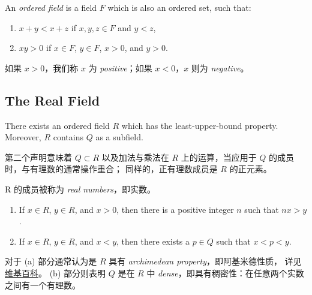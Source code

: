 \documentclass[../poma-notes.tex]{subfiles}
\begin{document}
\setcounter{poma}{16}
\begin{definition}
  An \textit{ordered field} is a field $F$ which is also an ordered set, such that:

  \begin{enumerate}
    \item $x+y<x+z$ if $x,y,z \in F$ and $y<z$,
    \item $xy>0$ if $x \in F$, $y \in F$, $x>0$, and $y>0$.
  \end{enumerate}
\end{definition}

如果 $x>0$，我们称 $x$ 为 \textit{positive}；如果 $x<0$，$x$ 则为 \textit{negative}。

\subsection*{The Real Field}

\setcounter{poma}{18}
\begin{theorem}
  There exists an ordered field $R$ which has the least-upper-bound property.
  Moreover, $R$ contains $Q$ as a subfield.
\end{theorem}

第二个声明意味着 $Q \subset R$ 以及加法与乘法在 $R$ 上的运算，当应用于 $Q$ 的成员时，与有理数的通常操作重合；
同样的，正有理数成员是 $R$ 的正元素。

R 的成员被称为 \textit{real numbers}，即实数。


\begin{theorem}
  \leavevmode
  \begin{enumerate}[label=(\alph*)]
    \item If $x \in R$, $y \in R$, and $x>0$, then there is a positive integer $n$ such that $nx>y$.
    \item If $x \in R$, $y \in R$, and $x<y$, then there exists a $p \in Q$ such that $x<p<y$.
  \end{enumerate}
\end{theorem}

对于 (a) 部分通常认为是 $R$ 具有 \textit{archimedean property}，即阿基米德性质，
详见\href{https://en.wikipedia.org/wiki/Archimedean_property}{维基百科}。
(b) 部分则表明 $Q$ 是在 $R$ 中 \textit{dense}，即具有稠密性：在任意两个实数之间有一个有理数。
\end{document}
